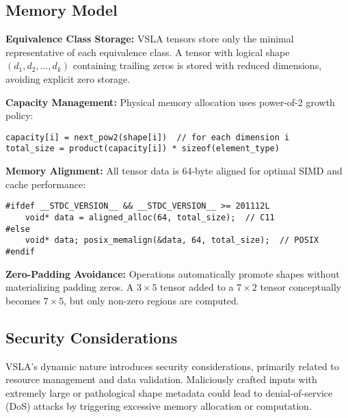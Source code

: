 \documentclass[11pt]{article}
\begin{document}
\subsection{Memory Model}
\label{sec:memory}

\begin{tcolorbox}[colback=memory,colframe=red!50!black,title=Memory Layout and Optimization]
\textbf{Equivalence Class Storage:} VSLA tensors store only the minimal representative of each equivalence class. A tensor with logical shape $(d_1, d_2, \ldots, d_k)$ containing trailing zeros is stored with reduced dimensions, avoiding explicit zero storage.

\textbf{Capacity Management:} Physical memory allocation uses power-of-2 growth policy:
\begin{verbatim}
capacity[i] = next_pow2(shape[i])  // for each dimension i
total_size = product(capacity[i]) * sizeof(element_type)  
\end{verbatim}

\textbf{Memory Alignment:} All tensor data is 64-byte aligned for optimal SIMD and cache performance:
\begin{verbatim}
#ifdef __STDC_VERSION__ && __STDC_VERSION__ >= 201112L
    void* data = aligned_alloc(64, total_size);  // C11
#else
    void* data; posix_memalign(&data, 64, total_size);  // POSIX
#endif
\end{verbatim}

\textbf{Zero-Padding Avoidance:} Operations automatically promote shapes without materializing padding zeros. A $3 \times 5$ tensor added to a $7 \times 2$ tensor conceptually becomes $7 \times 5$, but only non-zero regions are computed.
\end{tcolorbox}

\subsection{Security Considerations}
VSLA's dynamic nature introduces security considerations, primarily related to resource management and data validation. Maliciously crafted inputs with extremely large or pathological shape metadata could lead to denial-of-service (DoS) attacks by triggering excessive memory allocation or computation.
\end{document}
